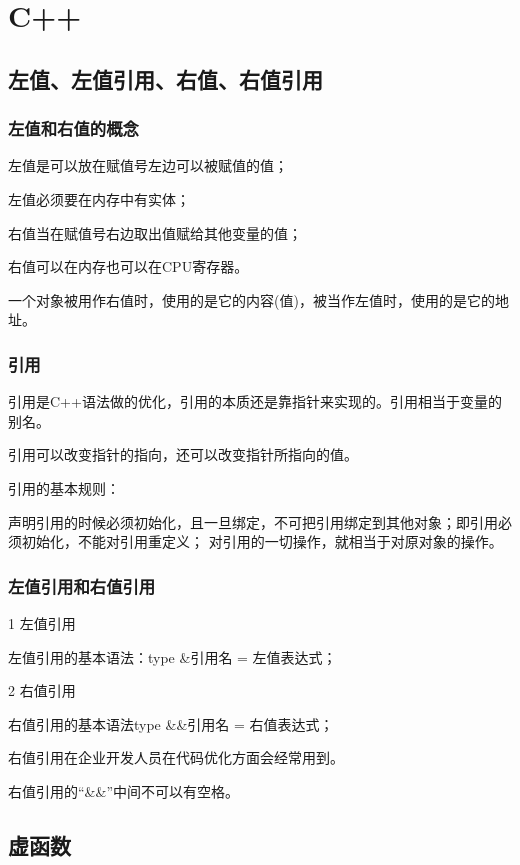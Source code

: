 \section{C++}
\subsection{左值、左值引用、右值、右值引用}
\subsubsection{左值和右值的概念}

左值是可以放在赋值号左边可以被赋值的值；

左值必须要在内存中有实体；

右值当在赋值号右边取出值赋给其他变量的值；

右值可以在内存也可以在CPU寄存器。

一个对象被用作右值时，使用的是它的内容(值)，被当作左值时，使用的是它的地址。

\subsubsection{引用}

引用是C++语法做的优化，引用的本质还是靠指针来实现的。引用相当于变量的别名。

引用可以改变指针的指向，还可以改变指针所指向的值。

引用的基本规则：

声明引用的时候必须初始化，且一旦绑定，不可把引用绑定到其他对象；即引用必须初始化，不能对引用重定义；
对引用的一切操作，就相当于对原对象的操作。

\subsubsection{左值引用和右值引用}

1 左值引用

左值引用的基本语法：type \&引用名 = 左值表达式；

2 右值引用

右值引用的基本语法type \&\&引用名 = 右值表达式；

右值引用在企业开发人员在代码优化方面会经常用到。

右值引用的“\&\&”中间不可以有空格。

\subsection{虚函数}

